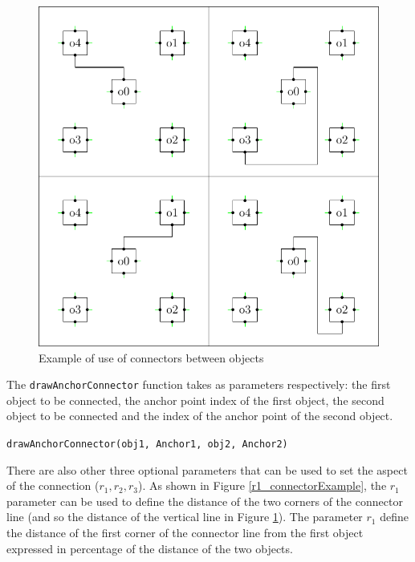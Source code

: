 \documentclass[a4paper,12pt]{report}
\begin{document}
\begin{figure}[ht]
  \centering
  \includegraphics[width=1.0\textwidth]{N-S}
  \caption{Example of use of connectors between objects}
  \label{connectorExample}
\end{figure}

The \texttt{drawAnchorConnector} function takes as parameters respectively: the first object to be connected,
the anchor point index of the first object, the second object to be connected and the index of the anchor point
of the second object.

\texttt{drawAnchorConnector(obj1, Anchor1, obj2, Anchor2)}

There are also other three optional parameters that can be used to set the aspect of the connection ($r_1,r_2,r_3$).
As shown in Figure \ref{r1_connectorExample}, the $r_1$ parameter can be used to define the distance of the two corners
of the connector line (and so the distance of the vertical line in Figure \ref{connectorExample}). The parameter $r_1$ define the distance of the first corner of the connector line from the first object expressed
in percentage of the distance of the two objects.
\end{document}

